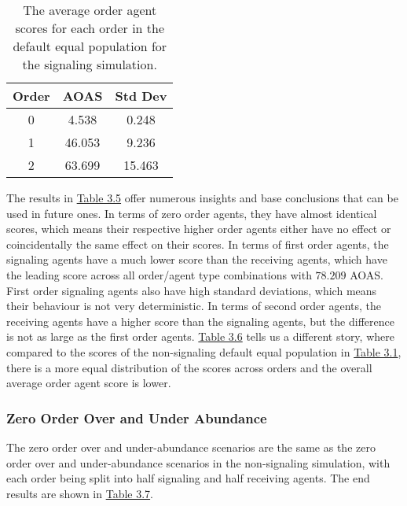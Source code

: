 \begin{table}[h]
    \centering
    \begin{tabular}{|c|c|c|}
    \hline
    Order & AOAS & Std Dev \\
    \hline
    0     & 4.538   & 0.248    \\
    1     & 46.053  & 9.236    \\
    2     & 63.699  & 15.463   \\
    \hline
    \end{tabular}
    \caption{The average order agent scores for each order in the default equal population for the signaling simulation.}
    \label{table:sig-default-equal-overall}
\end{table}

The results in \hyperref[table:sig-default-equal]{Table 3.5} offer numerous insights and base conclusions that can be used in future ones. In terms of zero order agents, they have almost identical scores, which means their respective higher order agents either have no effect or coincidentally the same effect on their scores. In terms of first order agents, the signaling agents have a much lower score than the receiving agents, which have the leading score across all order/agent type combinations with $78.209$ AOAS. First order signaling agents also have high standard deviations, which means their behaviour is not very deterministic. In terms of second order agents, the receiving agents have a higher score than the signaling agents, but the difference is not as large as the first order agents. \hyperref[table:sig-default-equal-overall]{Table 3.6} tells us a different story, where compared to the scores of the non-signaling default equal population in \hyperref[table:non-sig-default-equal-simple]{Table 3.1}, there is a more equal distribution of the scores across orders and the overall average order agent score is lower. 



\subsubsection{Zero Order Over and Under Abundance}

The zero order over and under-abundance scenarios are the same as the zero order over and under-abundance scenarios in the non-signaling simulation, with each order being split into half signaling and half receiving agents. The end results are shown in \hyperref[table:sig-zero-order-simple]{Table 3.7}.

